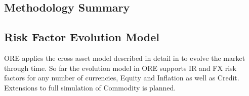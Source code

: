 \documentclass[12pt, a4paper]{article}
\begin{document}
{{









\newpage
\begin{appendix}

\section{Methodology Summary}

\subsection{Risk Factor Evolution Model}\label{sec:app_rfe}

ORE applies the cross asset model described in detail in \cite{Lichters} to evolve  the market through time. So far the
evolution model in ORE supports IR and FX risk factors for any number of currencies, Equity and Inflation as well as Credit. Extensions to full simulation of Commodity is planned. \\


\end{appendix}}}
\end{document}
